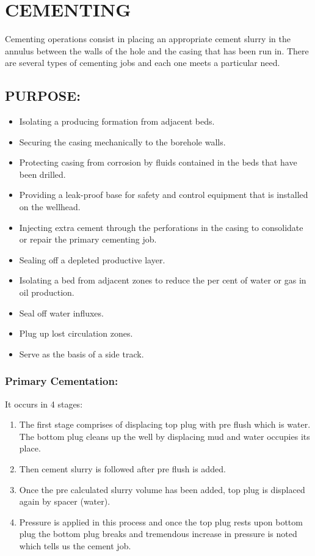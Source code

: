 \chapter{CEMENTING}
	
Cementing operations consist in placing an appropriate cement slurry in 
the annulus between the walls of the hole and the casing that has been run in.
There are several types of cementing jobs and each one meets a particular need.


\section*{PURPOSE:}

\begin{itemize}

\item Isolating a producing formation from adjacent beds.  
\item Securing the casing mechanically to the borehole walls.
\item Protecting casing from corrosion by fluids contained in the beds that have been drilled.
\item Providing a leak-proof base for safety and control equipment that is installed on the wellhead.
\item Injecting extra cement through the perforations in the casing to consolidate or repair the primary cementing job.
\item Sealing off a depleted productive layer.
\item Isolating a bed from adjacent zones to reduce the per cent of water or gas in oil production.
\item Seal off water influxes.
\item Plug up lost circulation zones.
\item Serve as the basis of a side track.

\end{itemize}


\subsection*{Primary Cementation:}

It occurs in 4 stages:
\begin{enumerate}
\item The first stage comprises of displacing top plug with pre flush
which is water. The bottom plug cleans up the well by
displacing mud and water occupies its place.

\item Then cement slurry is followed after pre flush is added.

\item Once the pre calculated slurry volume has been added, top plug
is displaced again by spacer (water).

\item Pressure is applied in this process and once the top plug rests
upon bottom plug the bottom plug breaks and tremendous
increase in pressure is noted which tells us the cement job.
\end{enumerate}

